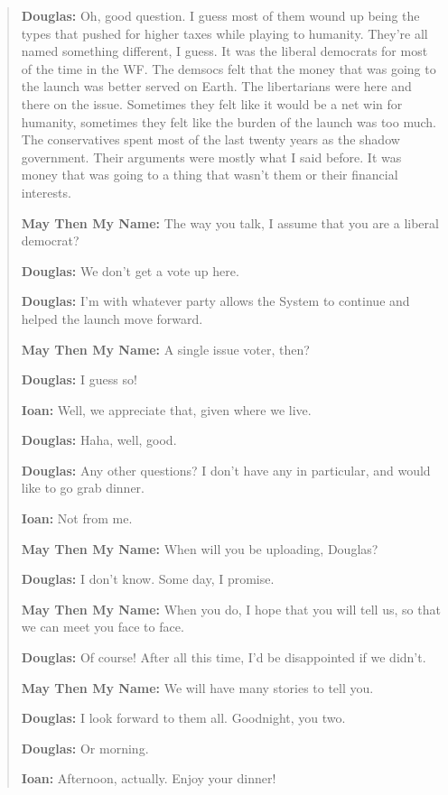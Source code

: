 \begin{quote}
\textbf{Douglas:} Oh, good question. I guess most of them wound up being the types that pushed for higher taxes while playing to humanity. They're all named something different, I guess. It was the liberal democrats for most of the time in the WF. The demsocs felt that the money that was going to the launch was better served on Earth. The libertarians were here and there on the issue. Sometimes they felt like it would be a net win for humanity, sometimes they felt like the burden of the launch was too much. The conservatives spent most of the last twenty years as the shadow government. Their arguments were mostly what I said before. It was money that was going to a thing that wasn't them or their financial interests.

\textbf{May Then My Name:} The way you talk, I assume that you are a liberal democrat?

\textbf{Douglas:} We don't get a vote up here.

\textbf{Douglas:} I'm with whatever party allows the System to continue and helped the launch move forward.

\textbf{May Then My Name:} A single issue voter, then?

\textbf{Douglas:} I guess so!

\textbf{Ioan:} Well, we appreciate that, given where we live.

\textbf{Douglas:} Haha, well, good.

\textbf{Douglas:} Any other questions? I don't have any in particular, and would like to go grab dinner.

\textbf{Ioan:} Not from me.

\textbf{May Then My Name:} When will you be uploading, Douglas?

\textbf{Douglas:} I don't know. Some day, I promise.

\textbf{May Then My Name:} When you do, I hope that you will tell us, so that we can meet you face to face.

\textbf{Douglas:} Of course! After all this time, I'd be disappointed if we didn't.

\textbf{May Then My Name:} We will have many stories to tell you.

\textbf{Douglas:} I look forward to them all. Goodnight, you two.

\textbf{Douglas:} Or morning.

\textbf{Ioan:} Afternoon, actually. Enjoy your dinner!
\end{quote}
